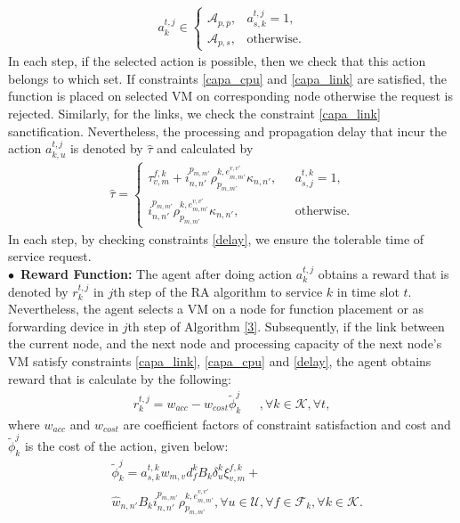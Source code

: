 \documentclass[20pt,twocolumn]{IEEEtran}
\begin{document}
\begin{align}
	a^{t,j}_{k}\in
	\begin{cases}
		\mathcal{A}_{p,p}, & a^{t,j}_{s,k}=1,\\
		\mathcal{A}_{p,s}, & \text{otherwise}.
	\end{cases}
\end{align}
 In each step, if the  selected action is possible, then we check that this action belongs to which set.   If constraints \eqref{capa_cpu} and \eqref{capa_link} are satisfied, the function is placed on selected VM on corresponding node otherwise the request is rejected.  Similarly, for the links, we check the constraint \eqref{capa_link} sanctification. Nevertheless, the processing and propagation delay that incur the action $a^{t,j}_{k,u}$  is denoted by $\hat{\tau}$ and  calculated by
\begin{align}
	\hat{\tau} = 
	\begin{cases}
		\tau^{f,k}_{v,m} + i^{p_{m,m'}}_{n,n'}\rho^{k,e^{v,v'}_{m,m'}}_{p_{m,m'}}\kappa_{{n,n'}},     ~~~ &a^{t,k}_{s,j} =1,\\
		i^{p_{m,m'}}_{n,n'}\rho^{k,e^{v,v'}_{m,m'}}_{p_{m,m'}}\kappa_{{n,n'}},~~~ &\text{otherwise}.
	\end{cases}
\end{align}
In each step,  by checking constraints \eqref{delay}, we ensure the tolerable time of service request. 
\\$\bullet$~\textbf{Reward Function:} The agent after doing  action $a^{t,j}_{k}$ obtains a reward that is denoted by $r^{t,j}_{k}$ in $j$th step of the RA algorithm to service $k$ in time slot $t$. Nevertheless,  the agent selects a VM on a node for function placement or as forwarding device in $j$th step of Algorithm \ref{3}. Subsequently, if the  link between the current node, and the next node and  processing capacity of the next node's VM satisfy constraints \eqref{capa_link}, \eqref{capa_cpu} and \eqref{delay}, the agent obtains reward that is calculate by the following: 
\begin{align}
r^{t,j}_{k}=w_{acc}-w_{cost}\tilde{\phi}^{j}_{k}  ~~~ &, \forall k \in \mathcal{K}, \forall t,
\end{align} 
where $w_{acc}$ and $w_{cost}$ are coefficient factors of constraint satisfaction and cost and $\tilde{\phi}^{j}_{k}$ is the cost of the action, given below:
\begin{align}
&\tilde{\phi}^{j}_{k}= a^{t,k}_{s,k}w_{m,v}d^{k}_{f}B_{k}\delta^{k}_{u}\xi^{f,k}_{v,m}+
\\ \nonumber
&\hat{w}_{{n,n'}}B_{k}i^{p_{m,m'}}_{n,n'}\rho^{k,e^{v,v'}_{m,m'}}_{p_{m,m'}}, \forall u \in \mathcal{U}, \forall f \in \mathcal{F}_{k},\forall k \in \mathcal{K}.
\end{align} 
\end{document}
